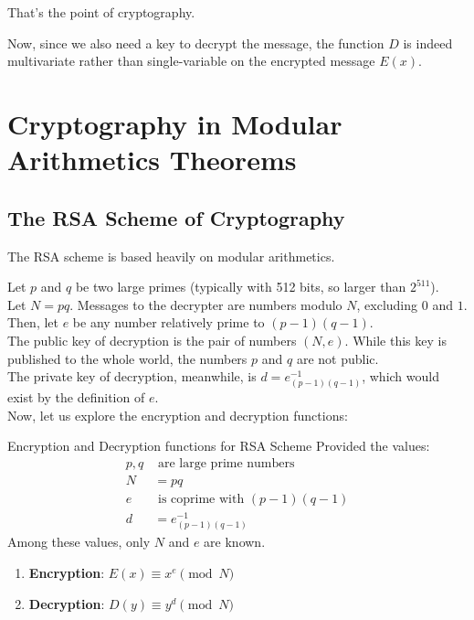 That's the point of cryptography.

Now, since we also need a key to decrypt the message, the function $D$ is indeed multivariate rather than single-variable on the encrypted message $E(x)$.

\section{Cryptography in Modular Arithmetics Theorems}

\subsection{The RSA Scheme of Cryptography}
The RSA scheme is based heavily on modular arithmetics.

Let $p$ and $q$ be two large primes (typically with 512 bits, so larger than $2^{511}$). \\
Let $N = pq$. Messages to the decrypter are numbers modulo $N$, excluding $0$ and $1$. \\
Then, let $e$ be any number relatively prime to $(p - 1)(q - 1)$. \\
The public key of decryption is the pair of numbers $(N, e)$. While this key is published to the whole world, the numbers $p$ and $q$ are not public. \\
The private key of decryption, meanwhile, is $d = {e}_{(p - 1)(q - 1)}^{-1}$, which would exist by the definition of $e$. \\
Now, let us explore the encryption and decryption functions:
\begin{ln-define}{Encryption and Decryption functions for RSA Scheme}{}
    Provided the values:
    \begin{align*}
        p, q &\text{ are large prime numbers} \\
        N &= pq \\
        e &\text{ is coprime with $(p - 1)(q - 1)$} \\
        d &= {e}_{(p - 1)(q - 1)}^{-1}
    \end{align*}
    Among these values, only $N$ and $e$ are known.
    \begin{enumerate}
        \item[] \textbf{Encryption}: $E(x) \equiv x^e\pmod{N}$
        \item[] \textbf{Decryption}: $D(y) \equiv y^d\pmod{N}$
    \end{enumerate}
\end{ln-define}
